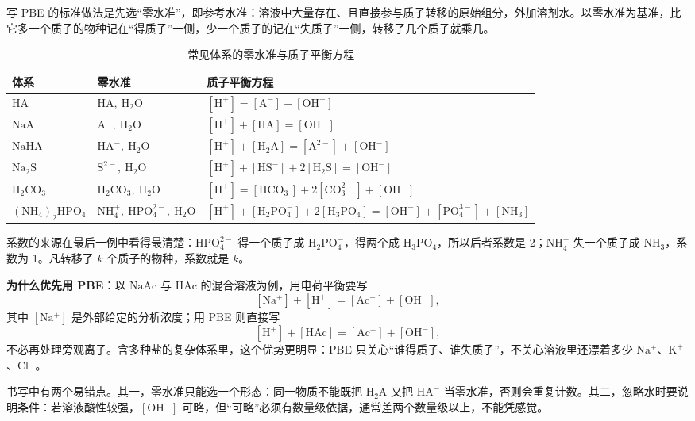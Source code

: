\documentclass[UTF8]{ctexbook}
\begin{document}
写 PBE 的标准做法是先选“零水准”，即参考水准：溶液中大量存在、且直接参与质子转移的原始组分，外加溶剂水。以零水准为基准，比它多一个质子的物种记在“得质子”一侧，少一个质子的记在“失质子”一侧，转移了几个质子就乘几。

\begin{table}[H]
\centering
\caption{常见体系的零水准与质子平衡方程}
\begin{tabular}{p{2.4cm}p{4.6cm}p{7.6cm}}
\toprule
体系 & 零水准 & 质子平衡方程 \\
\midrule
\(\mathrm{HA}\) & \(\mathrm{HA},\ \mathrm{H_2O}\) & \([\mathrm{H^+}]=[\mathrm{A^-}]+[\mathrm{OH^-}]\) \\
\(\mathrm{NaA}\) & \(\mathrm{A^-},\ \mathrm{H_2O}\) & \([\mathrm{H^+}]+[\mathrm{HA}]=[\mathrm{OH^-}]\) \\
\(\mathrm{NaHA}\) & \(\mathrm{HA^-},\ \mathrm{H_2O}\) & \([\mathrm{H^+}]+[\mathrm{H_2A}]=[\mathrm{A^{2-}}]+[\mathrm{OH^-}]\) \\
\(\mathrm{Na_2S}\) & \(\mathrm{S^{2-}},\ \mathrm{H_2O}\) & \([\mathrm{H^+}]+[\mathrm{HS^-}]+2[\mathrm{H_2S}]=[\mathrm{OH^-}]\) \\
\(\mathrm{H_2CO_3}\) & \(\mathrm{H_2CO_3},\ \mathrm{H_2O}\) & \([\mathrm{H^+}]=[\mathrm{HCO_3^-}]+2[\mathrm{CO_3^{2-}}]+[\mathrm{OH^-}]\) \\
\((\mathrm{NH_4})_2\mathrm{HPO_4}\) & \(\mathrm{NH_4^+},\ \mathrm{HPO_4^{2-}},\ \mathrm{H_2O}\) & \([\mathrm{H^+}]+[\mathrm{H_2PO_4^-}]+2[\mathrm{H_3PO_4}]=[\mathrm{OH^-}]+[\mathrm{PO_4^{3-}}]+[\mathrm{NH_3}]\) \\
\bottomrule
\end{tabular}
\end{table}

系数的来源在最后一例中看得最清楚：\(\mathrm{HPO_4^{2-}}\) 得一个质子成 \(\mathrm{H_2PO_4^-}\)，得两个成 \(\mathrm{H_3PO_4}\)，所以后者系数是 2；\(\mathrm{NH_4^+}\) 失一个质子成 \(\mathrm{NH_3}\)，系数为 1。凡转移了 \(k\) 个质子的物种，系数就是 \(k\)。

\textbf{为什么优先用 PBE}：以 \(\mathrm{NaAc}\) 与 \(\mathrm{HAc}\) 的混合溶液为例，用电荷平衡要写
\[
[\mathrm{Na^+}]+[\mathrm{H^+}]=[\mathrm{Ac^-}]+[\mathrm{OH^-}],
\]
其中 \([\mathrm{Na^+}]\) 是外部给定的分析浓度；用 PBE 则直接写
\[
[\mathrm{H^+}]+[\mathrm{HAc}]=[\mathrm{Ac^-}]+[\mathrm{OH^-}],
\]
不必再处理旁观离子。含多种盐的复杂体系里，这个优势更明显：PBE 只关心“谁得质子、谁失质子”，不关心溶液里还漂着多少 \(\mathrm{Na^+}\)、\(\mathrm{K^+}\)、\(\mathrm{Cl^-}\)。

书写中有两个易错点。其一，零水准只能选一个形态：同一物质不能既把 \(\mathrm{H_2A}\) 又把 \(\mathrm{HA^-}\) 当零水准，否则会重复计数。其二，忽略水时要说明条件：若溶液酸性较强，\([\mathrm{OH^-}]\) 可略，但“可略”必须有数量级依据，通常差两个数量级以上，不能凭感觉。
\end{document}
